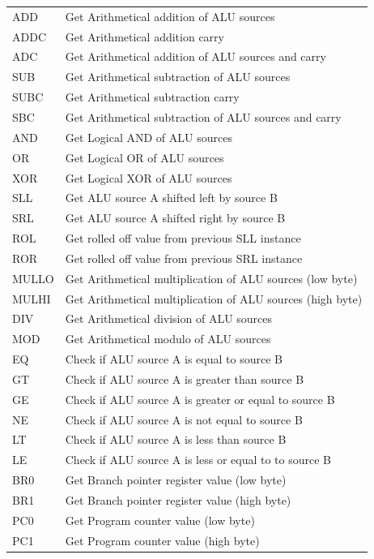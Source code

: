 \begin{longtable}[h!]{| l | p{} |}
	ADD  & Get Arithmetical addition of ALU sources \\
	ADDC & Get Arithmetical addition carry \\
	ADC  & Get Arithmetical addition of ALU sources and carry \\\hline
	
	SUB  & Get Arithmetical subtraction of ALU sources \\
	SUBC & Get Arithmetical subtraction carry \\
	SBC  & Get Arithmetical subtraction of ALU sources and carry \\\hline
	
	AND  & Get Logical AND of ALU sources \\
	OR   & Get Logical OR of ALU sources \\
	XOR  & Get Logical XOR of ALU sources \\\hline
	
	SLL  & Get ALU source A shifted left by source B \\
	SRL  & Get ALU source A shifted right by source B \\
	ROL  & Get rolled off value from previous SLL instance \\
	ROR  & Get rolled off value from previous SRL instance \\\hline
	
	MULLO& Get Arithmetical multiplication of ALU sources (low byte) \\
	MULHI& Get Arithmetical multiplication of ALU sources (high byte) \\
	DIV  & Get Arithmetical division of ALU sources \\
	MOD  & Get Arithmetical modulo of ALU sources \\\hline
	
	EQ   & Check if ALU source A is equal to source B \\
	GT   & Check if ALU source A is greater than source B \\
	GE   & Check if ALU source A is greater or equal to source B \\
	NE   & Check if ALU source A is not equal to source B \\
	LT   & Check if ALU source A is less than source B \\
	LE   & Check if ALU source A is less or equal to to source B \\\hline
	
	BR0  & Get Branch pointer register value (low byte) \\
	BR1  & Get Branch pointer register value (high byte) \\	
	PC0  & Get Program counter value (low byte) \\
	PC1  & Get Program counter value (high byte) \\\hline
	

\end{longtable}
